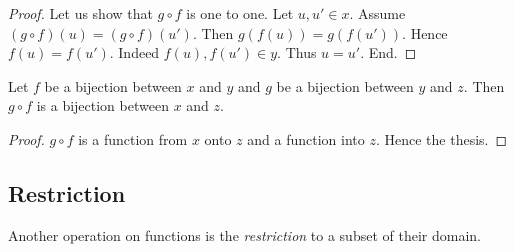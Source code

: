 \documentclass[../../set-theory.tex]{subfiles}
\begin{document}
\begin{forthel}
\begin{proof}
      Let us show that $g \circ f$ is one to one.
        Let $u,u' \in x$.
        Assume $(g \circ f)(u) = (g \circ f)(u')$.
        Then $g(f(u)) = g(f(u'))$.
        Hence $f(u) = f(u')$.
        Indeed $f(u), f(u') \in y$.
        Thus $u = u'$.
      End.
    \end{proof}

    \begin{corollary}\label{SetTheory_02_01_627406}
      Let $f$ be a bijection between $x$ and $y$ and $g$ be a bijection between $y$ and $z$.
      Then $g \circ f$ is a bijection between $x$ and $z$.
    \end{corollary}
    \begin{proof}
      $g \circ f$ is a function from $x$ onto $z$ and a function into $z$.
      Hence the thesis.
    \end{proof}
  \end{forthel}


  \subsection{Restriction}

  Another operation on functions is the \textit{restriction} to a subset of
  their domain.
\end{document}
